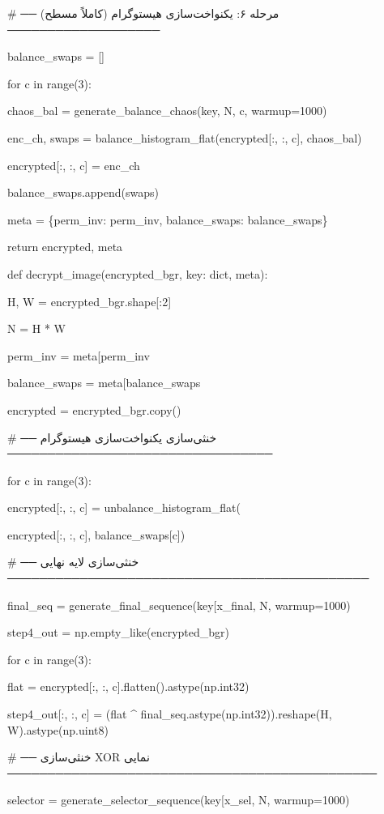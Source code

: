 \# ── مرحله ۶: یکنواخت‌سازی هیستوگرام (کاملاً مسطح) ───────────────────

balance\_swaps = {[}{]}

for c in range(3):

chaos\_bal = generate\_balance\_chaos(key, N, c, warmup=1000)

enc\_ch, swaps = balance\_histogram\_flat(encrypted{[}:, :, c{]}, chaos\_bal)

encrypted{[}:, :, c{]} = enc\_ch

balance\_swaps.append(swaps)

meta = \{\textquotesingle perm\_inv\textquotesingle: perm\_inv, \textquotesingle balance\_swaps\textquotesingle: balance\_swaps\}

return encrypted, meta

def decrypt\_image(encrypted\_bgr, key: dict, meta):

H, W = encrypted\_bgr.shape{[}:2{]}

N = H * W

perm\_inv = meta{[}\textquotesingle perm\_inv\textquotesingle{]}

balance\_swaps = meta{[}\textquotesingle balance\_swaps\textquotesingle{]}

encrypted = encrypted\_bgr.copy()

\# ── خنثی‌سازی یکنواخت‌سازی هیستوگرام ─────────────────────────────────

for c in range(3):

encrypted{[}:, :, c{]} = unbalance\_histogram\_flat(

encrypted{[}:, :, c{]}, balance\_swaps{[}c{]})

\# ── خنثی‌سازی لایه نهایی ─────────────────────────────────────────────

final\_seq = generate\_final\_sequence(key{[}\textquotesingle x\_final\textquotesingle{]}, N, warmup=1000)

step4\_out = np.empty\_like(encrypted\_bgr)

for c in range(3):

flat = encrypted{[}:, :, c{]}.flatten().astype(np.int32)

step4\_out{[}:, :, c{]} = (flat \^{} final\_seq.astype(np.int32)).reshape(H, W).astype(np.uint8)

\# ── خنثی‌سازی XOR نمایی ──────────────────────────────────────────────

selector = generate\_selector\_sequence(key{[}\textquotesingle x\_sel\textquotesingle{]}, N, warmup=1000)

